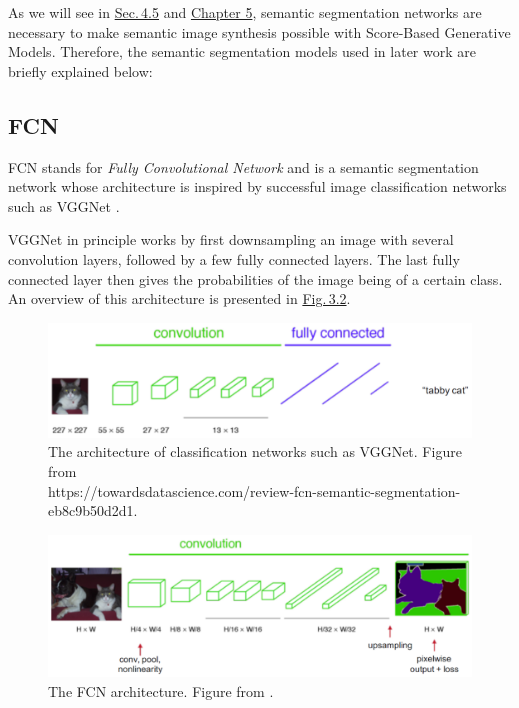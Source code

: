 As we will see in \hyperref[sec:4.5]{Sec.\,4.5} and \hyperref[chap:5]{Chapter 5}, semantic segmentation networks are necessary to make semantic image synthesis possible with Score-Based Generative Models. Therefore, the semantic segmentation models used in later work are briefly explained below:
%
\subsection{FCN} \label{sec:3.1.1}
FCN \cite{fcn} stands for \textit{Fully Convolutional Network} and is a semantic segmentation network whose architecture is inspired by successful image classification networks such as VGGNet \cite{vgg}. 

VGGNet in principle works by first downsampling an image with several convolution layers, followed by a few fully connected layers. The last fully connected layer then gives the probabilities of the image being of a certain class. An overview of this architecture is presented in \hyperref[fig:3.2]{Fig.\,3.2}.
%
\begin{figure} \label{fig:3.2}
    \centering
    \includegraphics[width=.65\textwidth]{Chapters/figures/vgg.PNG}
    \caption[The architecture of classification networks]{The architecture of classification networks such as VGGNet. Figure from\\ https://towardsdatascience.com/review-fcn-semantic-segmentation-eb8c9b50d2d1.}
\end{figure}
%
%
\begin{figure}[b] \label{fig:3.3}
    \centering
    \includegraphics[width=.65\textwidth]{Chapters/figures/fcn.PNG}
    \caption[The FCN architecture]{The FCN architecture. Figure from \cite{fcn}.}
\end{figure}
%

